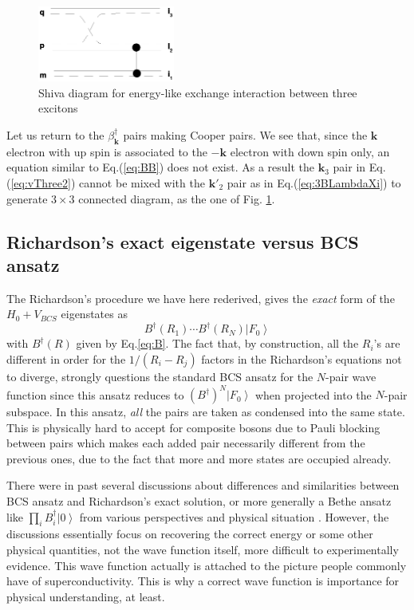 \documentclass[epj]{svjour}
\newcommand{\vk}{\ensuremath{\mathbf{k}}}
\begin{document}
 
\begin{figure}[htb]
   \includegraphics[width=0.4\textwidth]{threeExciton.eps}
\caption{Shiva diagram for energy-like exchange interaction between three excitons\label{fig:threeExciton} }
 \end{figure}


Let us return to the $\beta^\dagger_\vk$ pairs making Cooper pairs. We see that, since the $\vk$ electron with up spin is associated to the $-\vk$ electron with down spin only, an equation similar to Eq.(\ref{eq:BB}) does not exist.  As a result the $\vk_3$ pair in Eq.(\ref{eq:vThree2}) cannot be mixed with the $\vk'_2$ pair as in Eq.(\ref{eq:3BLambdaXi}) to generate $3\times3$ connected diagram, as the one of Fig. \ref{fig:threeExciton}.


\subsection{Richardson's exact eigenstate versus BCS ansatz}

The Richardson's procedure we have here rederived, gives the 
\emph{exact} form of the $H_0+V_{BCS}$ eigenstates as 
\begin{equation}
B^{\dagger}(R_1)\cdots{}B^{\dagger}(R_N)\left|F_0\right>  
\end{equation}
with $B^{\dagger}(R)$ given by Eq.\eqref{eq:B}. The fact that, by
construction, all the $R_i$'s are different in order for the $1/(R_i-R_j)$ factors in the Richardson's equations not to diverge, strongly questions the standard
BCS ansatz for the $N$-pair wave function since this ansatz reduces to $\left(B^{\dagger}\right)
^N\left|F_0\right> $ when projected into the $N$-pair subspace. In this ansatz,  \emph{all} the pairs are taken as condensed into the same state. This is physically hard to accept for composite bosons due to Pauli blocking between pairs which makes each added pair necessarily different from the previous ones, due to the fact that more and more states are occupied already. 

There were in past several discussions about differences and similarities between BCS ansatz and Richardson's exact solution, or more generally a Bethe ansatz like $\prod_iB^\dagger_i\left|0\right>$ from various perspectives and physical situation \cite{bang,hasegawa}.  However, the discussions essentially focus on recovering the correct energy or some other physical quantities, not the wave function itself, more difficult to experimentally evidence. This wave function actually is attached to the picture people commonly have of superconductivity. This is why a correct wave function is importance for physical understanding, at least.
\end{document}

